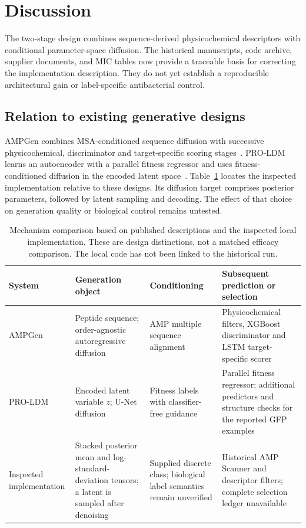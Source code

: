 \documentclass[journal]{IEEEtran}
\begin{document}
\section{Discussion}
The two-stage design combines sequence-derived physicochemical descriptors with conditional parameter-space diffusion. The historical manuscripts, code archive, supplier documents, and MIC tables now provide a traceable basis for correcting the implementation description. They do not yet establish a reproducible architectural gain or label-specific antibacterial control.

\subsection{Relation to existing generative designs}
AMPGen combines MSA-conditioned sequence diffusion with successive physicochemical, discriminator and target-specific scoring stages~\cite{jin2025ampgen}. PRO-LDM learns an autoencoder with a parallel fitness regressor and uses fitness-conditioned diffusion in the encoded latent space~\cite{zhang2025proldm}. Table~\ref{tab:mechanism_positioning} locates the inspected implementation relative to these designs. Its diffusion target comprises posterior parameters, followed by latent sampling and decoding. The effect of that choice on generation quality or biological control remains untested.

\begin{table}[!t]
\centering
\caption{Mechanism comparison based on published descriptions and the inspected local implementation. These are design distinctions, not a matched efficacy comparison. The local code has not been linked to the historical run.}
\label{tab:mechanism_positioning}
\begin{tabular}{@{}>{\raggedright\arraybackslash}p{}>{\raggedright\arraybackslash}p{}>{\raggedright\arraybackslash}p{}>{\raggedright\arraybackslash}p{}@{}}
\toprule
System & Generation object & Conditioning & Subsequent prediction or selection \\
\midrule
AMPGen~\cite{jin2025ampgen} & Peptide sequence; order-agnostic autoregressive diffusion & AMP multiple sequence alignment & Physicochemical filters, XGBoost discriminator and LSTM target-specific scorer \\
\addlinespace
PRO-LDM~\cite{zhang2025proldm} & Encoded latent variable $z$; U-Net diffusion & Fitness labels with classifier-free guidance & Parallel fitness regressor; additional predictors and structure checks for the reported GFP examples \\
\addlinespace
Inspected implementation & Stacked posterior mean and log-standard-deviation tensors; a latent is sampled after denoising & Supplied discrete class; biological label semantics remain unverified & Historical AMP Scanner and descriptor filters; complete selection ledger unavailable \\
\bottomrule
\end{tabular}
\end{table}
\end{document}

